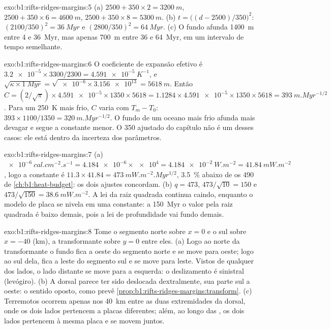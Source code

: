 \begin{solution}{exo:b1:rifts-ridges-margins:5}
(a) $2500 + 350\times2 = \qty{3200}{m}$, $2500 + 350\times6 = \qty{4600}{m}$,
$2500 + 350\times8 = \qty{5300}{m}$. (b) $t = \bigl((d - 2500)/350\bigr)^2$:
$(2100/350)^2 = \qty{36}{Myr}$ e $(2800/350)^2 = \qty{64}{Myr}$. (c) O
fundo afunda \qty{1400}{m} entre 4 e \qty{36}{Myr}, mas apenas \qty{700}{m}
entre 36 e \qty{64}{Myr}, em um intervalo de tempo semelhante.
\end{solution}

\begin{solution}{exo:b1:rifts-ridges-margins:6}
O coeficiente de expansão efetivo é
$\num{3.2e-5}\times3300/2300 = \qty{4.591e-5}{K^{-1}}$, e
$\sqrt{\kappa\times\qty{1}{Myr}} = \sqrt{\num{e-6}\times\num{3.156e13}} =
\qty{5618}{m}$. Então $C = (2/\sqrt\pi)\times\num{4.591e-5}\times1350\times5618 =
1.1284\times\num{4.591e-5}\times1350\times5618 = \qty{393}{m.Myr^{-1/2}}$. Para um
 \qty{250}{K} mais frio, $C$ varia com $T_m - T_0$:
$393\times1100/1350 = \qty{320}{m.Myr^{-1/2}}$. O fundo de um oceano mais frio
afunda mais devagar e segue a constante menor. O \num{350} ajustado do
capítulo não é um desses casos: ele está dentro da incerteza dos parâmetros.
\end{solution}

\begin{solution}{exo:b1:rifts-ridges-margins:7}
(a) $\qty{e-6}{cal.cm^{-2}.s^{-1}} = \num{4.184e-6}\times\num{e4} =
\qty{4.184e-2}{W.m^{-2}} = \qty{41.84}{mW.m^{-2}}$, logo a constante é
$11.3\times41.84 = \qty{473}{mW.m^{-2}.Myr^{1/2}}$, \qty{3.5}{\percent} abaixo de
os 490 de \cref{ch:b1:heat-budget}: os dois ajustes concordam. (b) $q = 473$,
$473/\sqrt{10} = 150$ e $473/\sqrt{150} = \qty{38.6}{mW.m^{-2}}$. A lei
da raiz quadrada continua caindo, enquanto o modelo de placa se nivela em uma constante:
a \qty{150}{Myr} o valor pela raiz quadrada é baixo demais, pois a lei de profundidade vai fundo demais.
\end{solution}

\begin{solution}{exo:b1:rifts-ridges-margins:8}
Tome o segmento norte sobre $x = 0$ e o sul sobre $x = -40$ (km), a transformante sobre $y = 0$ entre eles. (a) Logo ao norte da transformante o fundo
fica a oeste do segmento norte e se move para oeste; logo ao sul dela, fica a leste do segmento sul e se move para leste. Vistos de qualquer dos lados, o lado distante se move para a esquerda: o deslizamento é sinistral (levógiro). (b) A dorsal parece ter sido deslocada dextralmente, sua parte sul a oeste: o sentido oposto, como prevê \cref{prop:b1:rifts-ridges-margins:transform}.
(c) Terremotos ocorrem apenas nos \qty{40}{km} entre as duas extremidades da dorsal, onde os dois lados pertencem a placas diferentes; além, ao longo das , os dois lados pertencem à mesma placa e se movem juntos.
\end{solution}

